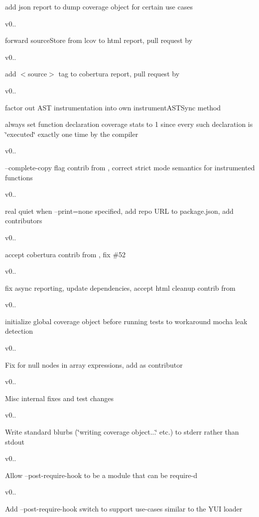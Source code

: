 add json report to dump coverage object for certain use cases 

v0..

forward source\+Store from lcov to html report, pull request by  

v0..

add $<$source$>$ tag to cobertura report, pull request by  

v0..


\begin{DoxyItemize}
\item factor out A\+S\+T instrumentation into own instrument\+A\+S\+T\+Sync method 
\item always set function declaration coverage stats to 1 since every such declaration is \char`\"{}executed\char`\"{} exactly one time by the compiler 
\end{DoxyItemize}

v0..

--complete-\/copy flag contrib from , correct strict mode semantics for instrumented functions 

v0..

real quiet when --print=none specified, add repo U\+R\+L to package.\+json, add contributors 

v0..

accept cobertura contrib from , fix \#52 

v0..

fix async reporting, update dependencies, accept html cleanup contrib from  

v0..

initialize global coverage object before running tests to workaround mocha leak detection 

v0..

Fix for null nodes in array expressions, add  as contributor 

v0..

Misc internal fixes and test changes 

v0..

Write standard blurbs (\char`\"{}writing coverage object...\char`\"{} etc.) to stderr rather than stdout 

v0..

Allow --post-\/require-\/hook to be a module that can be {\ttfamily require}-\/d 

v0..

Add --post-\/require-\/hook switch to support use-\/cases similar to the Y\+U\+I loader 

